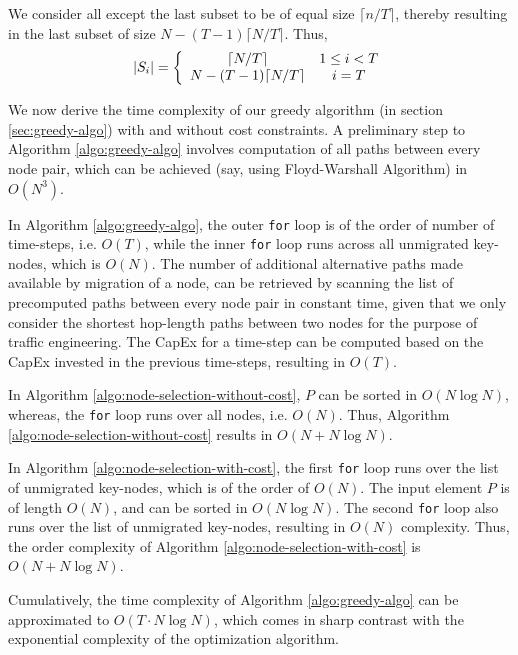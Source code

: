 \documentclass[conference]{IEEEtran}
\begin{document}
We consider all except the last subset to be of equal size $\lceil n/T
\rceil$, thereby resulting in the last subset of size $N -
(T-1)\lceil N/T \rceil$.
Thus, $$
|S_i|=
\left\{\begin{array}{c c}
\lceil N/T  \rceil & 1 \leq i < T\\
N - (T-1)\lceil N/T  \rceil & i=T\\
\end{array} \right.
$$

\par We now derive the time complexity of our greedy algorithm (in section
\ref{sec:greedy-algo}) with and without cost constraints. A preliminary step to
Algorithm \ref{algo:greedy-algo} involves computation of all paths between every
node pair, which can be achieved (say, using Floyd-Warshall Algorithm) in
$O(N^3)$.

\par In Algorithm \ref{algo:greedy-algo}, the outer \texttt{for} loop is of the
order of number of time-steps, i.e. $O(T)$, while the inner \texttt{for} loop
runs across all unmigrated key-nodes, which is $O(N)$. The number of additional
alternative paths made available by migration of a node, can be retrieved by
scanning the list of precomputed paths between every node pair in constant time,
given that we only consider the shortest hop-length paths between two nodes
for the purpose of traffic engineering. The CapEx for a time-step can be computed
based on the CapEx invested in the previous time-steps, resulting in
$O(T)$.

\par In Algorithm \ref{algo:node-selection-without-cost}, $P$ can be sorted in
$O(N \log N)$, whereas, the \texttt{for} loop runs over all nodes, i.e. $O(N)$.
Thus, Algorithm \ref{algo:node-selection-without-cost} results in $O(N+N\log
N)$.

\par In Algorithm \ref{algo:node-selection-with-cost}, the first \texttt{for}
loop runs over the list of unmigrated key-nodes, which is of the order of
$O(N)$. The input element $P$ is of length $O(N)$, and can be sorted in
$O(N \log N)$. The second \texttt{for} loop also runs over the list of
unmigrated key-nodes, resulting in $O(N)$ complexity. Thus, the order
complexity of Algorithm \ref{algo:node-selection-with-cost} is $O(N + N \log
N)$.

\par Cumulatively, the time complexity of Algorithm \ref{algo:greedy-algo} can
be approximated to $O(T\cdot N \log N)$, which comes in sharp contrast with
the exponential complexity of the optimization algorithm.
\end{document}
